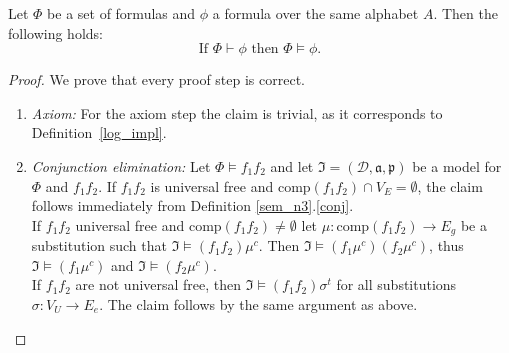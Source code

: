 \begin{theorem}\label{correctness}
Let $\Phi$ be a set of \nthree formulas  and $\phi$ a formula over the same \nthree alphabet $A$.  Then the following holds:
\[ \text{If } \Phi \vdash \phi \text{ then } \Phi \models \phi.\]
\end{theorem}


\begin{proof}

We prove that every proof step is correct.
\begin{enumerate}
\leftskip2.5em %
 \item \emph{Axiom:} For the axiom step the claim is trivial, as it corresponds to Definition~\ref{log_impl}.
 \item \emph{Conjunction elimination:}
 Let $\Phi\models f_1 f_2 $ and let  $\mathfrak{I}=(\mathcal{D},\mathfrak{a,p})$ be a model for $\Phi$ and $f_1 f_2$. 
 If $f_1 f_2$ is universal free and $\text{comp}(f_1f_2)\cap V_E=\emptyset$, the claim follows immediately 
 from Definition  \ref{sem_n3}.\ref{conj}. \\
 If $f_1f_2$ universal free and $\text{comp}(f_1f_2)\neq \emptyset$ let $\mu:\text{comp}(f_1f_2)\rightarrow E_g$ be a substitution such that
 $\mathfrak{I}\models (f_1f_2)\mu^c$. Then $\mathfrak{I}\models (f_1\mu^c) (f_2\mu^c)$, thus  $\mathfrak{I}\models (f_1\mu^c)$ and 
 $\mathfrak{I}\models (f_2\mu^c)$.\\
 If $f_1f_2$ are not universal free, then $\mathfrak{I}\models (f_1f_2)\sigma^t$ for all substitutions $\sigma:V_U\rightarrow E_e$. 
 The claim follows by the same 
 argument as above.

\end{enumerate}
\end{proof}

